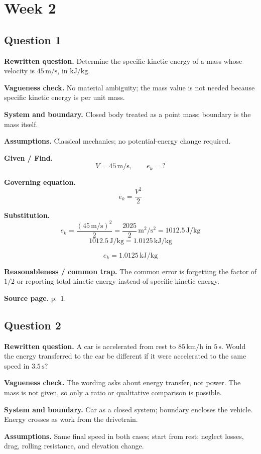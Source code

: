 \section*{Week 2}

\subsection*{Question 1}
\textbf{Rewritten question.} Determine the specific kinetic energy of a mass whose velocity is $45\,\mathrm{m/s}$, in $\mathrm{kJ/kg}$.

\textbf{Vagueness check.} No material ambiguity; the mass value is not needed because specific kinetic energy is per unit mass.

\textbf{System and boundary.} Closed body treated as a point mass; boundary is the mass itself.

\textbf{Assumptions.} Classical mechanics; no potential-energy change required.

\textbf{Given / Find.}
\[
V=45\,\mathrm{m/s},\qquad e_k=?
\]

\textbf{Governing equation.}
\[
 e_k=\frac{V^2}{2}
\]

\textbf{Substitution.}
\[
 e_k=\frac{(45\,\mathrm{m/s})^2}{2}=\frac{2025}{2}\,\mathrm{m^2/s^2}=1012.5\,\mathrm{J/kg}
\]
\[
 1012.5\,\mathrm{J/kg}=1.0125\,\mathrm{kJ/kg}
\]

\[\boxed{e_k=1.0125\,\mathrm{kJ/kg}}\]

\textbf{Reasonableness / common trap.} The common error is forgetting the factor of $1/2$ or reporting total kinetic energy instead of specific kinetic energy.

\textbf{Source page.} p.~1.

\subsection*{Question 2}
\textbf{Rewritten question.} A car is accelerated from rest to $85\,\mathrm{km/h}$ in $5\,\mathrm{s}$. Would the energy transferred to the car be different if it were accelerated to the same speed in $3.5\,\mathrm{s}$?

\textbf{Vagueness check.} The wording asks about energy transfer, not power. The mass is not given, so only a ratio or qualitative comparison is possible.

\textbf{System and boundary.} Car as a closed system; boundary encloses the vehicle. Energy crosses as work from the drivetrain.

\textbf{Assumptions.} Same final speed in both cases; start from rest; neglect losses, drag, rolling resistance, and elevation change.

